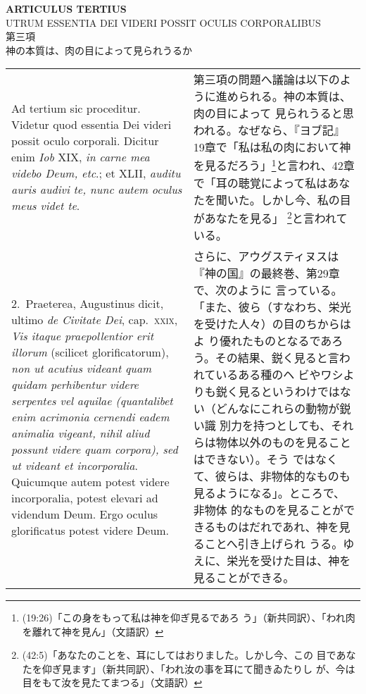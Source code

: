 \documentclass[10pt]{jsarticle} %
\begin{document}
\begin{center}
{\Large {\bf ARTICULUS TERTIUS}}\\
{\large UTRUM ESSENTIA DEI VIDERI POSSIT OCULIS CORPORALIBUS}\\
{\large 第三項\\神の本質は、肉の目によって見られうるか}
\end{center}

\begin{longtable}{p{21em}p{21em}}

{\sc \large Ad tertium sic proceditur}. Videtur quod essentia Dei videri
possit oculo corporali. Dicitur enim {\it Iob} XIX, {\it in carne mea videbo Deum,
etc}.; et XLII, {\it auditu auris audivi te, nunc autem oculus meus videt te}.

&

第三項の問題へ議論は以下のように進められる。神の本質は、肉の目によって
見られうると思われる。なぜなら、『ヨブ記』19章で「私は私の肉において神
を見るだろう」\footnote{(19:26)「この身をもって私は神を仰ぎ見るであろ
う」（新共同訳）、「われ肉を離れて神を見ん」（文語訳）}と言われ、42章
で「耳の聴覚によって私はあなたを聞いた。しかし今、私の目があなたを見る」
\footnote{(42:5)「あなたのことを、耳にしてはおりました。しかし今、この
目であなたを仰ぎ見ます」（新共同訳）、「われ汝の事を耳にて聞きゐたりし
が、今は目をもて汝を見たてまつる」（文語訳）}と言われている。

\\

2.~{\sc Praeterea}, Augustinus dicit, ultimo {\it de Civitate Dei},
cap.\ {\scshape xxix}, {\it Vis itaque praepollentior erit illorum}
(scilicet glorificatorum), {\it non ut acutius videant quam quidam
perhibentur videre serpentes vel aquilae (quantalibet enim acrimonia
cernendi eadem animalia vigeant, nihil aliud possunt videre quam
corpora), sed ut videant et incorporalia}.  Quicumque autem potest
videre incorporalia, potest elevari ad videndum Deum. Ergo oculus
glorificatus potest videre Deum.


&

さらに、アウグスティヌスは『神の国』の最終巻、第29章で、次のように
言っている。「また、彼ら（すなわち、栄光を受けた人々）の目のちからはよ
り優れたものとなるであろう。その結果、鋭く見ると言われているある種のヘ
ビやワシよりも鋭く見るというわけではない（どんなにこれらの動物が鋭い識
別力を持つとしても、それらは物体以外のものを見ることはできない）。そう
ではなくて、彼らは、非物体的なものも見るようになる」。ところで、非物体
的なものを見ることができるものはだれであれ、神を見ることへ引き上げられ
うる。ゆえに、栄光を受けた目は、神を見ることができる。


\end{longtable}
\end{document}
